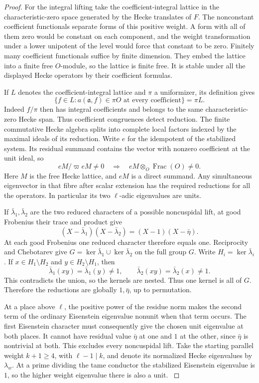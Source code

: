 \begin{proof}
For the integral lifting take the coefficient-integral
lattice in the characteristic-zero space generated by
the Hecke translates of \(F\). The nonconstant coefficient
functionals separate forms of this positive weight. A
form with all of them zero would be constant on each
component, and the weight transformation under a lower
unipotent of the level would force that constant to be
zero. Finitely many coefficient functionals suffice by
finite dimension. They embed the lattice into a finite free
\(O\)-module, so the lattice is finite free. It is stable
under all the displayed Hecke operators by their
coefficient formulas.

If \(L\) denotes the coefficient-integral lattice and \(\pi\) a uniformizer, its definition gives
\[
 \{f\in L:a(\mathfrak a,f)\in\pi O\text{ at every coefficient}\}
 =\pi L .
\]
Indeed \(f/\pi\) then has integral coefficients and belongs to the same characteristic-zero Hecke span. Thus coefficient congruences detect reduction. The finite commutative Hecke algebra splits into complete local
factors indexed by the maximal ideals of its reduction. Write \(e\)
for the idempotent of the stabilized system. Its residual summand
contains the vector with nonzero coefficient at the unit ideal, so
\[
       eM/\varpi eM\ne0\quad\Longrightarrow\quad
                    eM\otimes_O\operatorname{Frac}(O)\ne0 .
\]
Here \(M\) is the free Hecke lattice, and \(eM\) is a direct summand.
Any simultaneous eigenvector in that fibre after scalar
extension has the required reductions for all the operators.
In particular its two \(\ell\)-adic eigenvalues are units.

If \(\bar\lambda_1,\bar\lambda_2\) are the two reduced
characters of a possible noncuspidal lift, at good Frobenius
their trace and product give
\[
       (X-\bar\lambda_1)(X-\bar\lambda_2)
                    =(X-1)(X-\bar\eta).
\]
At each good Frobenius one reduced character therefore equals one.
Reciprocity and Chebotarev give \(G=\ker\bar\lambda_1\cup
\ker\bar\lambda_2\) on the full group \(G\). Write \(H_i=\ker\bar\lambda_i\). If \(x\in H_1\setminus H_2\) and \(y\in H_2\setminus H_1\), then
\[
 \bar\lambda_1(xy)=\bar\lambda_1(y)\ne1,\qquad
 \bar\lambda_2(xy)=\bar\lambda_2(x)\ne1 .
\]
This contradicts the union, so the kernels are nested. Thus one kernel is all of \(G\). Therefore the reductions
are globally \(1,\bar\eta\), up to permutation.

At a
place above \(\ell\), the positive power of the residue
norm makes the second term of the ordinary Eisenstein
eigenvalue nonunit when that term occurs. The first
Eisenstein character must consequently give the chosen
unit eigenvalue at both places. It cannot have residual
value \(\bar\eta\) at one and \(1\) at the other, since
\(\bar\eta\) is nontrivial at both. This excludes every
noncuspidal lift. Take the starting parallel weight \(k+1\ge4\), with
\(\ell-1\mid k\), and denote its normalized Hecke eigenvalues
by \(\lambda_w\). At a prime dividing the tame conductor
the stabilized Eisenstein eigenvalue is \(1\), so the higher
weight eigenvalue there is also a unit.
\label{cor:ordinary-promodularity-8}

\end{proof}

